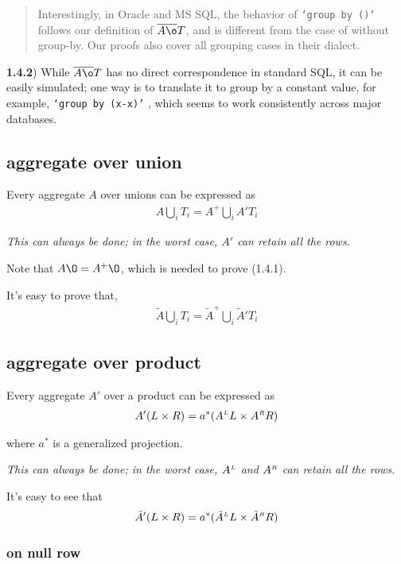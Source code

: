 \documentclass[article]{article}
\newcommand{\U}{\bigcup}
\newcommand{\ag}[1]{\overline{#1}}
\newcommand{\LL}{^\mathsmaller{\mathsmaller L}}
\newcommand{\RR}{^\mathsmaller{\mathsmaller R}}
\newcommand{\EA}{\tilde{A}}
\begin{document}
\begin{quote}
Interestingly, in Oracle and MS SQL, the behavior of {\tt `group by ()'} follows 
our definition of $\ag{A\o}T$, and is different from the case of without group-by. 
Our proofs also cover all grouping cases in their dialect.
\end{quote}

{\bf 1.4.2}) While $\ag{A\o}T$ has no direct correspondence in standard SQL,
it can be easily simulated; one way is to translate it to
group by a constant value, for example, 
{\tt `group by (x-x)'} , which seems to work consistently across major databases.


\subsection{ aggregate over union  }

Every aggregate $A$ over unions can be expressed as
\begin{align}
A\U_i T_i = A^+ \U_i A' T_i  
\end{align}

{\it This can always be done; in the worst case, $A'$ can retain all the rows. }

Note that $A\O = A^+ \O$, which is needed to prove (1.4.1).

It's easy to prove that, 
\begin{align}
 \EA \U_i T_i = \EA^+ \U_i \EA' T_i  
\end{align}


\subsection{ aggregate over product }

Every aggregate $A'$ over a product can be expressed as
\begin{align}
 A'(L \times R) = a^*( A\LL L \times A\RR R )
\end{align}

where $a^*$ is a generalized projection.

{\it This can always be done; in the worst case, $A\LL$ and $A\RR$ can retain all the rows.}

It's easy to see that
\begin{align}
 \EA' (L \times R) = a^*( \EA\LL L \times \EA\RR R )
\end{align}

\subsubsection{on null row}
\end{document}
